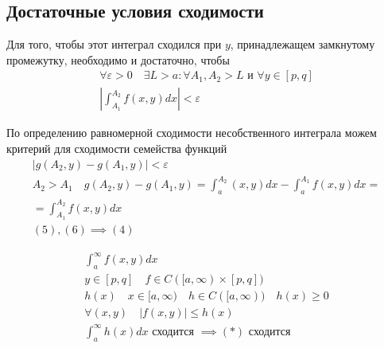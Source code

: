 \documentclass[main]{subfiles}
\begin{document}
     \subsection{Достаточные условия сходимости}
     \begin{theorem}
          Для того, чтобы этот интеграл сходился при $y$, принадлежащем замкнутому промежутку, необходимо и достаточно, чтобы
          \begin{gather*}
               \forall \varepsilon > 0 \quad \exists L > a : \forall A_1, A_2 > L \text{ и } \forall y \in [p,q] \\
               \left | \int^{A_2}_{A_1}  f(x,y) dx \right | < \varepsilon \tag{4} \end{gather*}
          \end{theorem}
          \begin{longProof}
               По определению равномерной сходимости несобственного интеграла можем критерий для сходимости семейства функций
               \begin{gather*}
               |g(A_2,y) - g(A_1,y)| < \varepsilon \tag{5}\\
               A_2 > A_1 \quad g(A_2,y) - g(A_1,y)  = \int^{A_2}_a(x,y) dx - \int^{A_1}_a f(x,y)dx = \\
               =\int^{A_2}_{A_1} f(x,y) dx \tag{6}\\
               (5),(6) \implies (4)
               \end{gather*}
          \end{longProof}
               \begin{theorem}
                  \begin{gather*}
                    \int^\infty_a f(x,y) dx  \tag{*}\\
                    y \in [p,q] \quad f \in C([a,\infty) \times [p,q]) \\
                    h(x) \quad x \in [a, \infty) \quad h \in C([a,\infty)) \quad h(x) \geq 0 \\
                    \forall (x,y) \quad |f(x,y)| \leq h(x) \tag{7}\\
                    \int^\infty_a h(x) dx \text{ сходится } \implies (*) \text{ сходится } \tag{8}\\
                  \end{gather*}  
               \end{theorem}
\end{document}
